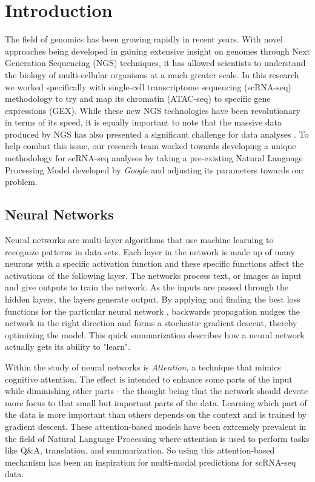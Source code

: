 \section{Introduction}

The field of genomics has been growing rapidly in recent years. 
With novel approaches being developed in gaining extensive insight on genomes through Next Generation Sequencing (NGS) techniques, it has allowed scientists to understand the biology of multi-cellular organisms at a much greater scale. 
In this research we worked specifically with single-cell transcriptome sequencing (scRNA-seq) methodology to try and map its chromatin (ATAC-seq) to specific gene expressions (GEX). 
While these new NGS technologies have been revolutionary in terms of its speed, it is equally important to note that the massive data produced by NGS has also presented a significant challenge for data analyses \cite{one}. 
To help combat this issue, our research team worked towards developing a unique methodology for scRNA-seq analyses by taking a pre-existing Natural Language Processing Model developed by \emph{Google} and adjusting its parameters towards our problem. 

\subsection{Neural Networks}

Neural networks are multi-layer algorithms that use machine learning to recognize patterns in data sets. 
Each layer in the network is made up of many neurons with a specific activation function and these specific functions affect the activations of the following layer. 
The networks process text, or images as input and give outputs to train the network. 
As the inputs are passed through the hidden layers, the layers generate output. By applying and finding the best loss functions for the particular neural network \cite{two}, backwards propagation nudges the network in the right direction and forms a stochastic gradient descent, thereby optimizing the model. 
This quick summarization describes how a neural network actually gets its ability to "learn".

Within the study of neural networks is \emph{Attention}, a technique that mimics cognitive attention. 
The effect is intended to enhance some parts of the input while diminishing other parts - the thought being that the network should devote more focus to that small but important parts of the data. 
Learning which part of the data is more important than others depends on the context and is trained by gradient descent. 
These attention-based models have been extremely prevalent in the field of Natural Language Processing where attention is used to perform tasks like Q\&A, translation, and summarization. So using this attention-based mechanism has been an inspiration for multi-modal predictions for scRNA-seq data.

